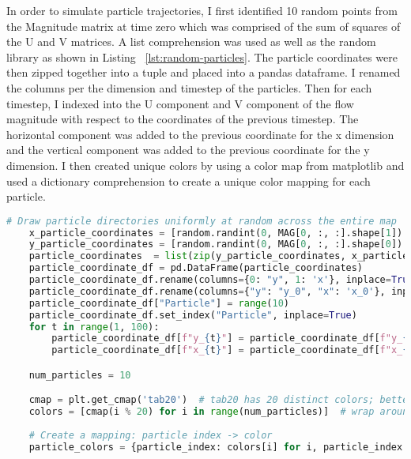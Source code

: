 \documentclass[11pt]{article}
\begin{document}
In order to simulate particle trajectories, I first identified 10 random points from the Magnitude matrix at time zero which was comprised of the sum of squares of the U and V matrices. A list comprehension was used as well as the random library as shown in Listing ~\ref{lst:random-particles}. The particle coordinates were then zipped together into a tuple and placed into a pandas dataframe. I renamed the columns per the dimension and timestep of the particles. Then for each timestep, I indexed into the U component and V component of the flow magnitude with respect to the coordinates of the previous timestep. The horizontal component was added to the previous coordinate for the x dimension and the vertical component was added to the previous coordinate for the y dimension. I then created unique colors by using a color map from matplotlib and used a dictionary comprehension to create a unique color mapping for each particle. 

\begin{lstlisting}[language=Python, label=lst:random-particles, caption={Defining Random Particles and Simulating Movement.}]
    # Draw particle directories uniformly at random across the entire map
    x_particle_coordinates = [random.randint(0, MAG[0, :, :].shape[1]) for _ in range(10)]
    y_particle_coordinates = [random.randint(0, MAG[0, :, :].shape[0]) for _ in range(10)]
    particle_coordinates  = list(zip(y_particle_coordinates, x_particle_coordinates))
    particle_coordinate_df = pd.DataFrame(particle_coordinates)
    particle_coordinate_df.rename(columns={0: "y", 1: 'x'}, inplace=True)
    particle_coordinate_df.rename(columns={"y": "y_0", "x": 'x_0'}, inplace=True)
    particle_coordinate_df["Particle"] = range(10)
    particle_coordinate_df.set_index("Particle", inplace=True)
    for t in range(1, 100):
        particle_coordinate_df[f"y_{t}"] = particle_coordinate_df[f"y_{t-1}"] + np.round(V[t, particle_coordinate_df[f"y_{t-1}"].values, particle_coordinate_df[f"x_{t-1}"].values]).astype(int)
        particle_coordinate_df[f"x_{t}"] = particle_coordinate_df[f"x_{t-1}"] + np.round(U[t, particle_coordinate_df[f"y_{t-1}"].values, particle_coordinate_df[f"x_{t-1}"].values]).astype(int)

    num_particles = 10

    cmap = plt.get_cmap('tab20')  # tab20 has 20 distinct colors; better for categorical data
    colors = [cmap(i % 20) for i in range(num_particles)]  # wrap around if >20 particles
        
    # Create a mapping: particle index -> color
    particle_colors = {particle_index: colors[i] for i, particle_index in enumerate(particle_coordinate_df.index)}
\end{lstlisting}
\end{document}
